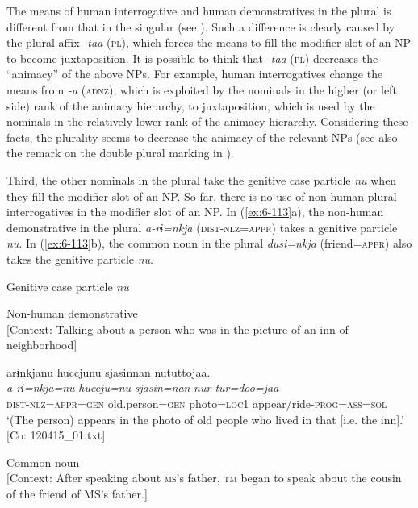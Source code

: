 The means of human interrogative and human demonstratives in the plural is different from that in the singular (see ). Such a difference is clearly caused by the plural affix \textit{-taa} (\textsc{pl}), which forces the means to fill the modifier slot of an NP to become juxtaposition. It is possible to think that \textit{-taa} (\textsc{pl}) decreases the “animacy” of the above NPs. For example, human interrogatives change the means from \textit{-a} (\textsc{adnz}), which is exploited by the nominals in the higher (or left side) rank of the animacy hierarchy, to juxtaposition, which is used by the nominals in the relatively lower rank of the animacy hierarchy. Considering these facts, the plurality seems to decrease the animacy of the relevant NPs (see also the remark on the double plural marking in ).

  Third, the other nominals in the plural take the genitive case particle \textit{nu} when they fill the modifier slot of an NP. So far, there is no use of non-human plural interrogatives in the modifier slot of an NP. In (\ref{ex:6-113}a), the non-human demonstrative in the plural \textit{a-rɨ=nkja} (\textsc{dist}-\textsc{nlz}=\textsc{appr}) takes a genitive particle \textit{nu}. In (\ref{ex:6-113}b), the common noun in the plural \textit{dusi=nkja} (friend=\textsc{appr}) also takes the genitive particle \textit{nu}.

\ea\label{ex:6-113}
  Genitive case particle \textit{nu}

 \ea Non-human demonstrative\\{}
[Context: Talking about a person who was in the picture of an inn of neighborhood]

{\TM}
\glll arɨnkjanu  huccjunu  sjasinnan      nututtojaa.\\
      \textit{a-rɨ=nkja=nu}  \textit{huccju=nu}  \textit{sjasin=nan}    \textit{nur-tur=doo=jaa}\\
      \textsc{dist}-\textsc{nlz}=\textsc{appr}=\textsc{gen}  old.person=\textsc{gen}  photo=\textsc{loc1} appear/ride-\textsc{prog}=\textsc{ass}=\textsc{sol}\\
\glt ‘(The person) appears in the photo of old people who lived in that [i.e. the inn].’ [Co: 120415\_01.txt]

\ex Common noun\\{}
[Context: After speaking about \textsc{ms}’s father, \textsc{tm} began to speak about the cousin of the friend of MS’s father.]

